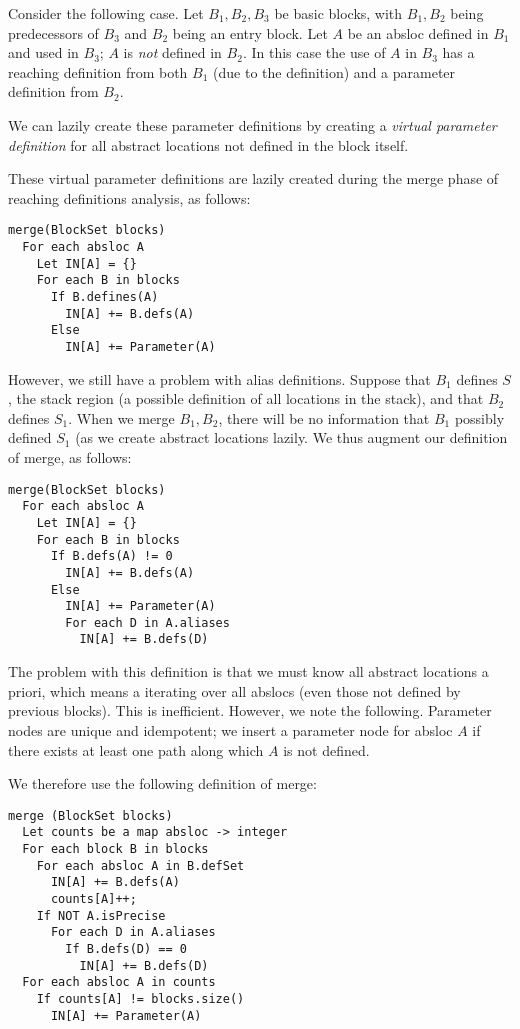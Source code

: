 \documentclass[11pt]{article}
\begin{document}
Consider the following case. Let $B_1, B_2, B_3$ be basic blocks, with
$B_1, B_2$ being predecessors of $B_3$ and $B_2$ being an entry
block. Let $A$ be an absloc defined in $B_1$ and used in $B_3$; $A$ is
\emph{not} defined in $B_2$. In this case the use of $A$ in $B_3$ has
a reaching definition from both $B_1$ (due to the definition) and a
parameter definition from $B_2$. 

We can lazily create these parameter definitions by creating a
\emph{virtual parameter definition} for all abstract locations not
defined in the block itself. 

These virtual parameter definitions are lazily created during the
merge phase of reaching definitions analysis, as follows:

\begin{verbatim}
merge(BlockSet blocks)
  For each absloc A
    Let IN[A] = {}
    For each B in blocks
      If B.defines(A)
        IN[A] += B.defs(A)
      Else
        IN[A] += Parameter(A)
\end{verbatim}

However, we still have a problem with alias definitions. Suppose that
$B_1$ defines $S$, the stack region (a possible definition of all
locations in the stack), and that $B_2$ defines $S_1$. When we merge
$B_1, B_2$, there will be no information that $B_1$ possibly defined
$S_1$ (as we create abstract locations lazily. We thus augment our
definition of merge, as follows:

\begin{verbatim}
merge(BlockSet blocks) 
  For each absloc A
    Let IN[A] = {}
    For each B in blocks
      If B.defs(A) != 0
        IN[A] += B.defs(A)
      Else 
        IN[A] += Parameter(A)
        For each D in A.aliases
          IN[A] += B.defs(D)
\end{verbatim}

The problem with this definition is that we must know all abstract
locations a priori, which means a iterating over all abslocs (even
those not defined by previous blocks). This is inefficient. However,
we note the following. Parameter nodes are unique and idempotent; we
insert a parameter node for absloc $A$ if there exists at least one
path along which $A$ is not defined. 

We therefore use the following definition of merge:

\begin{verbatim}
merge (BlockSet blocks)
  Let counts be a map absloc -> integer
  For each block B in blocks
    For each absloc A in B.defSet
      IN[A] += B.defs(A)
      counts[A]++;
    If NOT A.isPrecise
      For each D in A.aliases
        If B.defs(D) == 0
          IN[A] += B.defs(D)
  For each absloc A in counts
    If counts[A] != blocks.size()
      IN[A] += Parameter(A)
\end{verbatim}
\end{document}
